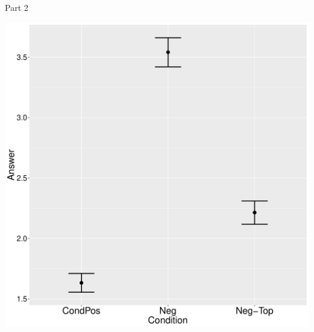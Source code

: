 \documentclass[ignorenonframetext,]{beamer}
\begin{document}
\begin{frame}{Part 2}

\begin{center}
\includegraphics[scale=0.23]{exp1-ani-part_2-errorbars.pdf}
\end{center}

\end{frame}
\end{document}
